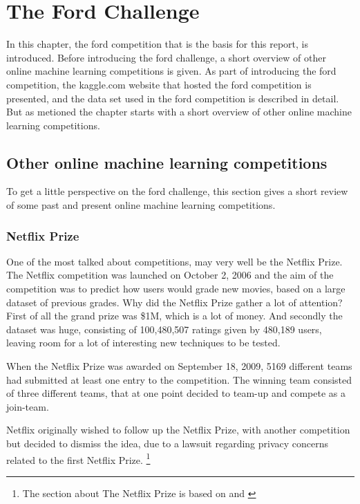 \chapter{The Ford Challenge} 
In this chapter, the ford competition that is the basis for this report, is introduced. Before introducing the ford challenge, a short overview of other online machine learning competitions is given. As part of introducing the ford competition, the kaggle.com website that hosted the ford competition is presented, and the data set used in the ford competition is described in detail. But as metioned the chapter starts with a short overview of other online machine learning competitions.

\section{Other online machine learning competitions}
To get a little perspective on the ford challenge, this section gives a short review of some past and present online machine learning competitions.

\subsection{Netflix Prize}
One of the most talked about competitions, may very well be the Netflix Prize. The Netflix competition was launched on October 2, 2006 and the aim of the competition was to predict how users would grade new movies, based on a large dataset of previous grades. Why did the Netflix Prize gather a lot of attention? First of all the grand prize was \$1M, which is a lot of money. And secondly the dataset was huge, consisting of 100,480,507 ratings given by 480,189 users, leaving room for a lot of interesting new techniques to be tested. \par 
When the Netflix Prize was awarded on September 18, 2009, 5169 different teams had submitted at least one entry to the competition. The winning team consisted of three different teams, that at one point decided to team-up and compete as a join-team.\par 
Netflix originally wished to follow up the Netflix Prize, with another competition but decided to dismiss the idea, due to a lawsuit regarding privacy concerns related to the first Netflix Prize. \footnote{The section about The Netflix Prize is based on \citep{wiki:netflix_prize} and \citep{netflix_leaderboard}}

